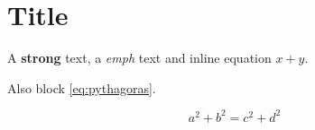 \documentclass[a4paper]{article}
\begin{document}

\section{Title}

A \textbf{strong} text, a \emph{emph} text and inline equation $x + y$.

Also block \eqref{eq:pythagoras}.

\begin{equation}
    a^2 + b^2 = c^2 + d^2 \label{eq:pythagoras}
\end{equation}
\end{document}
